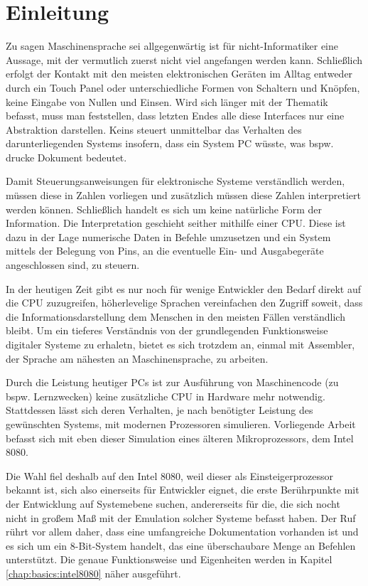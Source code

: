 \chapter{Einleitung}

Zu sagen Maschinensprache sei allgegenwärtig ist für nicht-Informatiker eine Aussage, mit der vermutlich zuerst nicht viel angefangen werden kann. Schließlich erfolgt der Kontakt mit den meisten elektronischen Geräten im Alltag entweder durch ein Touch Panel oder unterschiedliche Formen von Schaltern und Knöpfen, keine Eingabe von Nullen und Einsen. Wird sich länger mit der Thematik befasst, muss man feststellen, dass letzten Endes alle diese Interfaces nur eine Abstraktion darstellen. Keins steuert unmittelbar das Verhalten des darunterliegenden Systems insofern, dass ein System PC wüsste, was bspw. \glqq drucke Dokument\grqq{} bedeutet.

Damit Steuerungsanweisungen für elektronische Systeme verständlich werden, müssen diese in Zahlen vorliegen und zusätzlich müssen diese Zahlen interpretiert werden können. Schließlich handelt es sich um keine natürliche Form der Information. Die Interpretation geschieht seither mithilfe einer \ac{CPU}. Diese ist dazu in der Lage numerische Daten in Befehle umzusetzen und ein System mittels der Belegung von Pins, an die eventuelle Ein- und Ausgabegeräte angeschlossen sind, zu steuern.

In der heutigen Zeit gibt es nur noch für wenige Entwickler den Bedarf direkt auf die \ac{CPU} zuzugreifen, höherlevelige Sprachen vereinfachen den Zugriff soweit, dass die Informationsdarstellung dem Menschen in den meisten Fällen verständlich bleibt. Um ein tieferes Verständnis von der grundlegenden Funktionsweise digitaler Systeme zu erhaletn, bietet es sich trotzdem an, einmal mit Assembler, der Sprache am nähesten an Maschinensprache, zu arbeiten.
\medskip

Durch die Leistung heutiger PCs ist zur Ausführung von Maschinencode (zu bspw. Lernzwecken) keine zusätzliche \ac{CPU} in Hardware mehr notwendig. Stattdessen lässt sich deren Verhalten, je nach benötigter Leistung des gewünschten Systems, mit modernen Prozessoren simulieren. Vorliegende Arbeit befasst sich mit eben dieser Simulation eines älteren Mikroprozessors, dem Intel 8080.

Die Wahl fiel deshalb auf den Intel 8080, weil dieser als \glqq Einsteigerprozessor\grqq{} bekannt ist, sich also einerseits für Entwickler eignet, die erste Berührpunkte mit der Entwicklung auf Systemebene suchen, andererseits für die, die sich nocht nicht in großem Maß mit der Emulation solcher Systeme befasst haben. Der Ruf rührt vor allem daher, dass eine umfangreiche Dokumentation vorhanden ist und es sich um ein 8-Bit-System handelt, das eine überschaubare Menge an Befehlen unterstützt. Die genaue Funktionsweise und Eigenheiten werden in Kapitel \ref{chap:basics:intel8080} näher ausgeführt.

